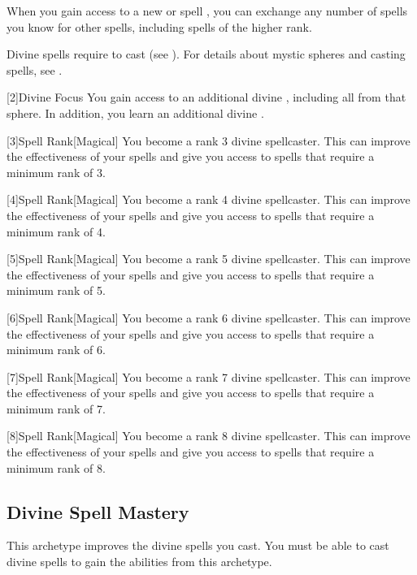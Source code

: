         When you gain access to a new  or spell ,
            you can exchange any number of spells you know for other spells,
            including spells of the higher rank.

        Divine spells require  to cast (see ).
        For details about mystic spheres and casting spells, see .

        [2]{Divine Focus} You gain access to an additional divine , including all  from that sphere.
        In addition, you learn an additional divine .

        [3]{Spell Rank}[Magical] You become a rank 3 divine spellcaster.
        This can improve the effectiveness of your spells and give you access to spells that require a minimum rank of 3.

        [4]{Spell Rank}[Magical] You become a rank 4 divine spellcaster.
        This can improve the effectiveness of your spells and give you access to spells that require a minimum rank of 4.

        [5]{Spell Rank}[Magical] You become a rank 5 divine spellcaster.
        This can improve the effectiveness of your spells and give you access to spells that require a minimum rank of 5.

        [6]{Spell Rank}[Magical] You become a rank 6 divine spellcaster.
        This can improve the effectiveness of your spells and give you access to spells that require a minimum rank of 6.

        [7]{Spell Rank}[Magical] You become a rank 7 divine spellcaster.
        This can improve the effectiveness of your spells and give you access to spells that require a minimum rank of 7.

        [8]{Spell Rank}[Magical] You become a rank 8 divine spellcaster.
        This can improve the effectiveness of your spells and give you access to spells that require a minimum rank of 8.

    \subsection{Divine Spell Mastery}
        This archetype improves the divine spells you cast.
        You must be able to cast divine spells to gain the abilities from this archetype.

